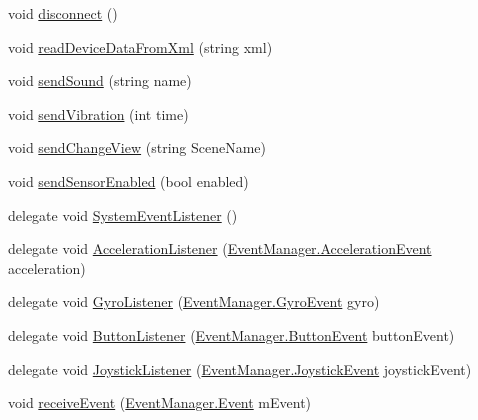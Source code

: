\begin{DoxyCompactItemize}
\item 
void \hyperlink{class_game_controller_a47e7610a9cddf869968b388926eab62a}{disconnect} ()
\item 
void \hyperlink{class_game_controller_a186282de3ec7fb68cde00368cbfd697d}{read\+Device\+Data\+From\+Xml} (string xml)
\item 
void \hyperlink{class_game_controller_aadac19b966dfc27827a6f68ea15d9cec}{send\+Sound} (string name)
\item 
void \hyperlink{class_game_controller_a662e97a1d293708aade81c6e2afd0a22}{send\+Vibration} (int time)
\item 
void \hyperlink{class_game_controller_a8d4cf54c02ecd7cff7dd3995116efac5}{send\+Change\+View} (string Scene\+Name)
\item 
void \hyperlink{class_game_controller_a300e1d194e0c3271776659f7149ca8a6}{send\+Sensor\+Enabled} (bool enabled)
\item 
delegate void \hyperlink{class_game_controller_a6c79406c908b41c4f4520c6789d829e6}{System\+Event\+Listener} ()
\item 
delegate void \hyperlink{class_game_controller_a87b7db4c19ae1dd2ecbf94c6f1be5c90}{Acceleration\+Listener} (\hyperlink{class_event_manager_1_1_acceleration_event}{Event\+Manager.\+Acceleration\+Event} acceleration)
\item 
delegate void \hyperlink{class_game_controller_a5e0106b2e58b70c011fe7f7e9f58ecce}{Gyro\+Listener} (\hyperlink{class_event_manager_1_1_gyro_event}{Event\+Manager.\+Gyro\+Event} gyro)
\item 
delegate void \hyperlink{class_game_controller_a0d4534f57395c87d869dc90a70419e7f}{Button\+Listener} (\hyperlink{class_event_manager_1_1_button_event}{Event\+Manager.\+Button\+Event} button\+Event)
\item 
delegate void \hyperlink{class_game_controller_a653ceafbd20d279abc65adf386a358aa}{Joystick\+Listener} (\hyperlink{class_event_manager_1_1_joystick_event}{Event\+Manager.\+Joystick\+Event} joystick\+Event)
\item 
void \hyperlink{class_game_controller_a5b9e4d1735ec8d689a35ad187aefe1e9}{receive\+Event} (\hyperlink{class_event_manager_1_1_event}{Event\+Manager.\+Event} m\+Event)
\end{DoxyCompactItemize}
